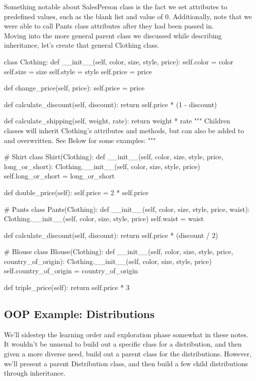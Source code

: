 Something notable about SalesPerson class is the fact we set attributes to predefined values, such as the blank list and value of 0. Additionally, note that we were able to call Pants class attributes after they had been passed in.
\\

Moving into the more general parent class we discussed while describing inheritance, let's create that general Clothing class.

\begin{python}
	class Clothing:
		def __init__(self, color, size, style, price):
			self.color = color
			self.size = size
			self.style = style
			self.price = price
		
		def change_price(self, price):
			self.price = price
		
		def calculate_discount(self, discount):
			return self.price * (1 - discount)
		
		def calculate_shipping(self, weight, rate):
			return weight * rate
	"""
	Children classes will inherit Clothing's attributes and methods,
	but can also be added to and overwritten.
	See Below for some examples:
	"""
	
	# Shirt
	class Shirt(Clothing):
		def __init__(self, color, size, style, price, long_or_short):
			Clothing.__init__(self, color, size, style, price)
			self.long_or_short = long_or_short
		
		def double_price(self):
		self.price = 2 * self.price
	
	# Pants
	class Pants(Clothing):
		def __init__(self, color, size, style, price, waist):
			Clothing.__init__(self, color, size, style, price)
			self.waist = waist
		
		def calculate_discount(self, discount):
			return self.price * (discount / 2)
	
	# Blouse
	class Blouse(Clothing):
		def __init__(self, color, size, style, price, country_of_origin):
			Clothing.__init__(self, color, size, style, price)
			self.country_of_origin = country_of_origin
		
		def triple_price(self):
			return self.price * 3
\end{python}


\subsection{OOP Example: Distributions}
We'll sidestep the learning order and exploration phase somewhat in these notes. It wouldn't be unusual to build out a specific class for a distribution, and then given a more diverse need, build out a parent class for the distributions. However, we'll present a parent Distribution class, and then build a few child distributions through inheritance.
\\

